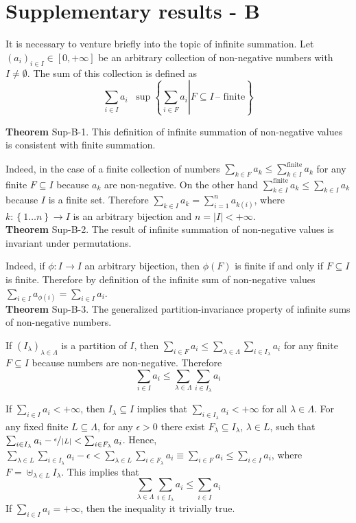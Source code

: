\documentclass[a4paper]{article}
\newcommand{\obj}[1]{\left\{ #1 \right \}}
\newcommand{\clo}[1]{\left [ #1 \right ]}
\newcommand{\brac}[1]{\left ( #1 \right )}
\newcommand{\induc}[1]{\left . #1 \right \vert}
\newcommand{\abs}[1]{\left | #1 \right |}
\newcommand{\Zinf}{\clo{ 0, +\infty }}
\newcommand{\defn}{\mathop{\overset{\Delta}{=}}\nolimits}
\begin{document}

\section{Supplementary results - B} %
\label{sec:sup_b}

It is necessary to venture briefly into the topic of infinite summation. Let $\brac{a_i}_{i\in I}\in \Zinf$ be an arbitrary collection of non-negative numbers with $I\neq \emptyset$. The sum of this collection is defined as \[\sum_{i\in I} a_i \defn \sup\obj{ \induc{ \sum_{i\in F} a_i } F\subseteq I\,\text{-- finite} }\]

\label{thm:inf_sum_consistency} \noindent \textbf{Theorem} Sup-B-1.
This definition of infinite summation of non-negative values is consistent with finite summation.

Indeed, in the case of a finite collection of numbers $\sum_{k\in F} a_k \leq \sum_{k\in I}^\text{finite} a_k$ for any finite $F\subseteq I$ because $a_k$ are non-negative. On the other hand $\sum_{k\in I}^\text{finite} a_k \leq \sum_{k\in I} a_k$ because $I$ is a finite set. Therefore $\sum_{k\in I} a_k = \sum_{i=1}^n a_{k\brac{i}}$, where $k:\obj{1\ldots n}\to I$ is an arbitrary bijection and $n=\abs{I}<+\infty$.\\

\label{thm:inf_sum_permutation} \noindent \textbf{Theorem} Sup-B-2.
The result of infinite summation of non-negative values is invariant under permutations.

Indeed, if $\phi:I\to I$ an arbitrary bijection, then $\phi\brac{F}$ is finite if and only if $F\subseteq I$ is finite. Therefore by definition of the infinite sum of non-negative values $\sum_{i\in I} a_{\phi\brac{i}} = \sum_{i\in I} a_i$.\\

\label{thm:non_neg_series_partition} \noindent \textbf{Theorem} Sup-B-3.
The generalized partition-invariance property of infinite sums of non-negative numbers.

If $\brac{I_\lambda}_{\lambda\in \Lambda}$ is a partition of $I$, then $\sum_{i\in F} a_i\leq \sum_{\lambda\in \Lambda} \sum_{i\in I_\lambda} a_i$ for any finite $F\subseteq I$ because numbers are non-negative. Therefore \[\sum_{i\in I} a_i \leq \sum_{\lambda\in \Lambda} \sum_{i\in I_\lambda} a_i\]

If $\sum_{i\in I} a_i < +\infty$, then $I_\lambda \subseteq I$ implies that $\sum_{i\in I_\lambda} a_i < +\infty$ for all $\lambda\in \Lambda$. For any fixed finite $L\subseteq \Lambda$, for any $\epsilon>0$ there exist $F_\lambda\subseteq I_\lambda$, $\lambda\in L$, such that $\sum_{i\in I_\lambda} a_i - \sfrac{\epsilon}{\abs{L}} < \sum_{i\in F_\lambda} a_i$. Hence, $\sum_{\lambda\in L} \sum_{i\in I_\lambda} a_i - \epsilon < \sum_{\lambda\in L} \sum_{i\in F_\lambda} a_i \equiv \sum_{i\in F} a_i \leq \sum_{i\in I} a_i$, where $F=\uplus_{\lambda \in L} I_\lambda$. This implies that \[\sum_{\lambda\in \Lambda} \sum_{i\in I_\lambda} a_i \leq \sum_{i\in I} a_i\] If $\sum_{i\in I} a_i = +\infty$, then the inequality it trivially true.\\
\end{document}
